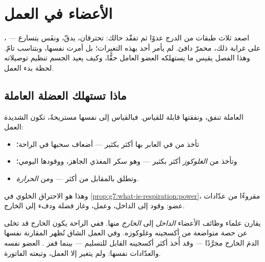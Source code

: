 \chapter{الأعضاء في العمل}\label{ch:g7:organs-at-work}

اصعد ثلاث طبقات من الدرج عدوًا ثم تفقّد حالك:  تحترقان، 
يدقّ، ونفَس يتسارع --- ، على غرابة ذلك، محمرّ دافئ. لم يأمر
أحد بهذه التغيرات؛ بل أمرت نفسها، وبتناسب تامّ. وهذا الفصل يقيس ما
يستهلكه العضو العامل حقًّا، وكيف يعيد الجسم تنظيم توصيلاته لحظة
بدء العمل.

\section{ماذا تستهلك العضلة العاملة}

\begin{proposition}\label{prop:g7:organs-at-work:bill}
 العاملة تنفق، ونفقتها قابلة للقياس. فبالقياس إلى 
نفسها مستريحةً، تكون  الشديدة العمل:
\begin{itemize}
  \item تأخذ من \emph{} في  العابر بها أكثر بكثير ---
        أضعاف سحبها في الراحة؛
  \item وتأخذ من \emph{الغلوكوز} أكثر بكثير --- وهو
        سكر  المغذي الجاهز، ووقودها اليومي؛
  \item وتطلق بالمقابل من \emph{} أكثر ---
        ومن \emph{الحرارة}.
\end{itemize}
وهذا هو الاحتراق الخلوي في
\cref{prop:g7:what-is-respiration:power}، مقروءًا من عدّادات عضو:
وقود  إلى الداخل، وعمل، وغاز فضلة ودفء إلى الخارج.
\end{proposition}
\admitted

\begin{example}\label{ex:g7:organs-at-work:measure}
يقارن علماء وظائف الأعضاء  \emph{الداخل} إلى  
\emph{الخارج} منها. ففي الراحة يكون  الخارج قد تخلى عن حصة
متواضعة من أكسجينه وغلوكوزه. وفي العمل الشاق تُظهر المقارنة نفسها
الدمَ الخارج مجرَّدًا --- وقد أُخذ أكثر أكسجينه القابل للتسليم ---
بينما قفز . العضو نفسه والعدّادات نفسها: ولم
يتغير إلا العمل، وتبعته الفاتورة.
\end{example}

